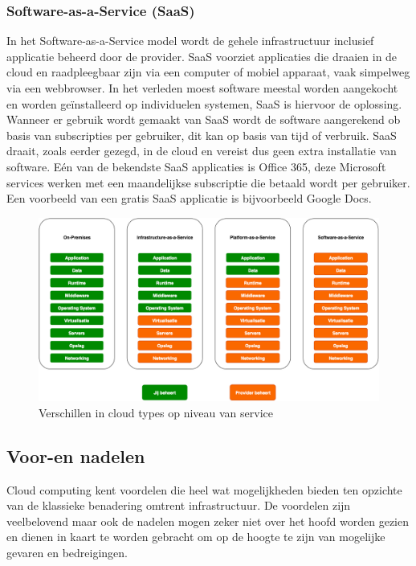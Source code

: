\subsubsection{Software-as-a-Service (SaaS)}
In het Software-as-a-Service model wordt de gehele infrastructuur inclusief applicatie beheerd door de provider. SaaS voorziet applicaties die draaien in de cloud en raadpleegbaar zijn via een computer of mobiel apparaat, vaak simpelweg via een webbrowser. In het verleden moest software meestal worden aangekocht en worden geïnstalleerd op individuelen systemen, SaaS is hiervoor de oplossing. Wanneer er gebruik wordt gemaakt van SaaS wordt de software aangerekend ob basis van subscripties per gebruiker, dit kan op basis van tijd of verbruik. SaaS draait, zoals eerder gezegd, in de cloud en vereist dus geen extra installatie van software. Eén van de bekendste SaaS applicaties is Office 365, deze Microsoft services werken met een maandelijkse subscriptie die betaald wordt per gebruiker. Een voorbeeld van een gratis SaaS applicatie is bijvoorbeeld Google Docs.
\begin{figure}
    \includegraphics[width=1\textwidth]{img/cloud_service_level.png}
    \caption{Verschillen in cloud types op niveau van service} 
    \label{fig:cloud-service-levels}  
\end{figure}
\newline

\subsection{Voor-en nadelen}
\label{voor-en-nadelen}
Cloud computing kent voordelen die heel wat mogelijkheden bieden ten opzichte van de klassieke benadering omtrent infrastructuur. \autocite{Azure2019} De voordelen zijn veelbelovend maar ook de nadelen mogen zeker niet over het hoofd worden gezien en dienen in kaart te worden gebracht om op de hoogte te zijn van mogelijke gevaren en bedreigingen.\autocite{Sosinsky2011} 

